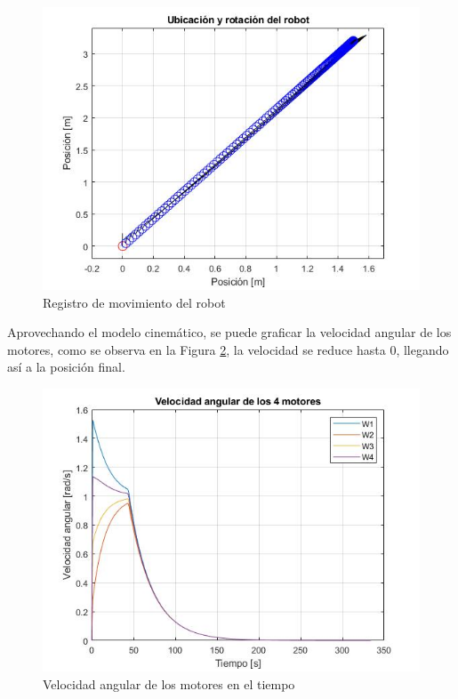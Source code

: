 \documentclass[conference]{IEEEtran}
\begin{document}
  \begin{figure}
    \includegraphics[width=\linewidth]{figures/matlab_pos_1.jpg}
    \caption{Registro de movimiento del robot}
    \label{fig:robotpos}
  \end{figure}


  Aprovechando el modelo cinemático, se puede graficar la velocidad angular de
  los motores, como se observa en la Figura \ref{fig:motorang}, la velocidad se reduce hasta 0,
  llegando así a la posición final.
  
  \begin{figure}
    \includegraphics[width=\linewidth]{figures/matlab_motor_1.jpg}
    \caption{Velocidad angular de los motores en el tiempo}
    \label{fig:motorang}
  \end{figure}
  
\end{document}
